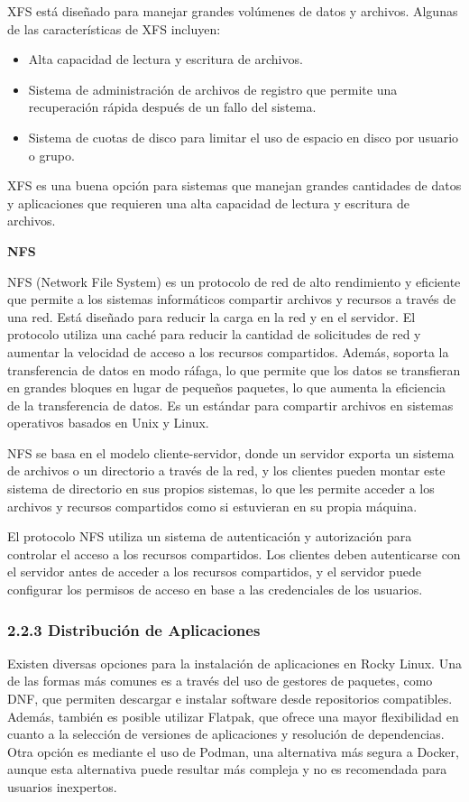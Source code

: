 \begin{doublespace}
    XFS está diseñado para manejar grandes volúmenes de datos y archivos. Algunas de las características de XFS incluyen:

    \begin{itemize}
        \item Alta capacidad de lectura y escritura de archivos.
        \item Sistema de administración de archivos de registro que permite una recuperación rápida después de un fallo del sistema.
        \item Sistema de cuotas de disco para limitar el uso de espacio en disco por usuario o grupo.
    \end{itemize}

    XFS es una buena opción para sistemas que manejan grandes cantidades de datos y aplicaciones que requieren una alta capacidad de lectura y escritura de archivos. \cite{RHEL-XFS-1}

    \textbf{NFS}
    
    NFS (Network File System) es un protocolo de red de alto rendimiento y eficiente que permite a los sistemas informáticos compartir archivos y recursos a través de una red. Está diseñado para reducir la carga en la red y en el servidor. El protocolo utiliza una caché para reducir la cantidad de solicitudes de red y aumentar la velocidad de acceso a los recursos compartidos. Además, soporta la transferencia de datos en modo ráfaga, lo que permite que los datos se transfieran en grandes bloques en lugar de pequeños paquetes, lo que aumenta la eficiencia de la transferencia de datos. Es un estándar para compartir archivos en sistemas operativos basados en Unix y Linux.

    NFS se basa en el modelo cliente-servidor, donde un servidor exporta un sistema de archivos o un directorio a través de la red, y los clientes pueden montar este sistema de directorio en sus propios sistemas, lo que les permite acceder a los archivos y recursos compartidos como si estuvieran en su propia máquina.

    El protocolo NFS utiliza un sistema de autenticación y autorización para controlar el acceso a los recursos compartidos. Los clientes deben autenticarse con el servidor antes de acceder a los recursos compartidos, y el servidor puede configurar los permisos de acceso en base a las credenciales de los usuarios. \cite{RHEL-NFS-1} \cite{RHEL-NFS-2}

    \subsubsection{2.2.3 Distribución de Aplicaciones}
    Existen diversas opciones para la instalación de aplicaciones en Rocky Linux. Una de las formas más comunes es a través del uso de gestores de paquetes, como DNF, que permiten descargar e instalar software desde repositorios compatibles. Además, también es posible utilizar Flatpak, que ofrece una mayor flexibilidad en cuanto a la selección de versiones de aplicaciones y resolución de dependencias. Otra opción es mediante el uso de Podman, una alternativa más segura a Docker, aunque esta alternativa puede resultar más compleja y no es recomendada para usuarios inexpertos.


\end{doublespace}
